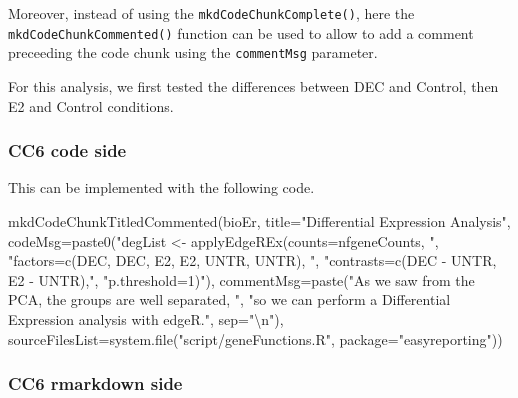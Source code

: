 \documentclass[
]{article}
\newenvironment{Shaded}{\begin{snugshade}}{\end{snugshade}}
\newcommand{\AttributeTok}[1]{\textcolor[rgb]{0.77,0.63,0.00}{#1}}
\newcommand{\FunctionTok}[1]{\textcolor[rgb]{0.00,0.00,0.00}{#1}}
\newcommand{\NormalTok}[1]{#1}
\newcommand{\SpecialCharTok}[1]{\textcolor[rgb]{0.00,0.00,0.00}{#1}}
\newcommand{\StringTok}[1]{\textcolor[rgb]{0.31,0.60,0.02}{#1}}
\begin{document}
Moreover, instead of using the \texttt{mkdCodeChunkComplete()}, here the
\texttt{mkdCodeChunkCommented()} function can be used to allow to add a
comment preceeding the code chunk using the \texttt{commentMsg}
parameter.

For this analysis, we first tested the differences between DEC and
Control, then E2 and Control conditions.

\hypertarget{cc6-code-side}{%
\subsubsection{CC6 code side}\label{cc6-code-side}}

This can be implemented with the following code.

\begin{Shaded}
\begin{Highlighting}[]
\FunctionTok{mkdCodeChunkTitledCommented}\NormalTok{(bioEr, }\AttributeTok{title=}\StringTok{"Differential Expression Analysis"}\NormalTok{,}
                \AttributeTok{codeMsg=}\FunctionTok{paste0}\NormalTok{(}\StringTok{"degList \textless{}{-} applyEdgeREx(counts=nfgeneCounts, "}\NormalTok{,}
                \StringTok{"factors=c(\textquotesingle{}DEC\textquotesingle{}, \textquotesingle{}DEC\textquotesingle{}, \textquotesingle{}E2\textquotesingle{}, \textquotesingle{}E2\textquotesingle{}, \textquotesingle{}UNTR\textquotesingle{}, \textquotesingle{}UNTR\textquotesingle{}), "}\NormalTok{,}
                \StringTok{"contrasts=c(\textquotesingle{}DEC {-} UNTR\textquotesingle{}, \textquotesingle{}E2 {-} UNTR\textquotesingle{}),"}\NormalTok{,}
                \StringTok{"p.threshold=1)"}\NormalTok{),}
            \AttributeTok{commentMsg=}\FunctionTok{paste}\NormalTok{(}\StringTok{"As we saw from the PCA, the groups are well separated, "}\NormalTok{,}
            \StringTok{"so we can perform a Differential Expression analysis with edgeR."}\NormalTok{, }\AttributeTok{sep=}\StringTok{"}\SpecialCharTok{\textbackslash{}n}\StringTok{"}\NormalTok{),}
            \AttributeTok{sourceFilesList=}\FunctionTok{system.file}\NormalTok{(}\StringTok{"script/geneFunctions.R"}\NormalTok{, }\AttributeTok{package=}\StringTok{"easyreporting"}\NormalTok{))}
\end{Highlighting}
\end{Shaded}

\hypertarget{cc6-rmarkdown-side}{%
\subsubsection{CC6 rmarkdown side}\label{cc6-rmarkdown-side}}
\end{document}
